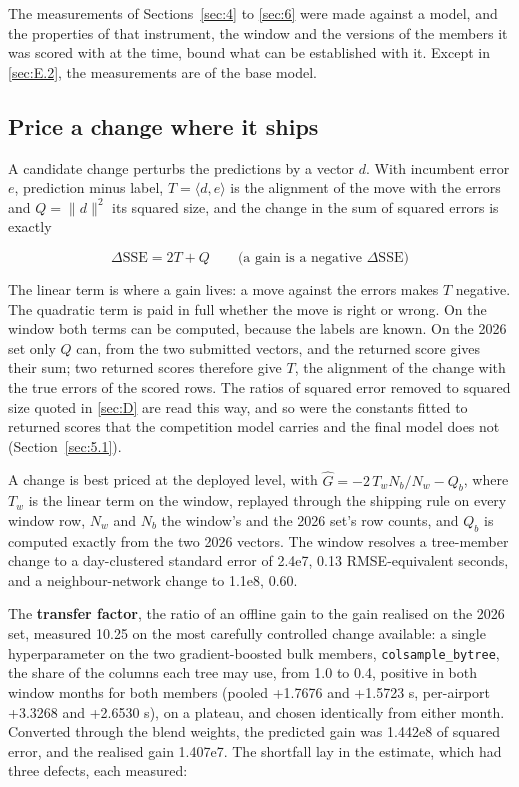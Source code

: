\documentclass[
  manuscript=article,
  layout=preprint,
  year=2026,
  volume=x,
]{extra/joas}
\begin{document}
The measurements of Sections~\ref{sec:4} to \ref{sec:6} were made against a model, and the properties of that instrument, the window and the versions of the members it was scored with at the time, bound what can be established with it. Except in \ref{sec:E.2}, the measurements are of the base model.

\subsection{Price a change where it ships}\label{sec:E.1}

A candidate change perturbs the predictions by a vector $d$. With incumbent error $e$, prediction minus label, $T = \langle d, e \rangle$ is the alignment of the move with the errors and $Q = \lVert d \rVert^2$ its squared size, and the change in the sum of squared errors is exactly

\begin{equation}
  \Delta \mathrm{SSE} = 2T + Q \qquad \text{(a gain is a negative } \Delta \mathrm{SSE}\text{)}
  \label{eq:identity}
\end{equation}

The linear term is where a gain lives: a move against the errors makes $T$ negative. The quadratic term is paid in full whether the move is right or wrong. On the window both terms can be computed, because the labels are known. On the 2026 set only $Q$ can, from the two submitted vectors, and the returned score gives their sum; two returned scores therefore give $T$, the alignment of the change with the true errors of the scored rows. The ratios of squared error removed to squared size quoted in \ref{sec:D} are read this way, and so were the constants fitted to returned scores that the competition model carries and the final model does not (Section~\ref{sec:5.1}).

A change is best priced at the deployed level, with $\hat{G} = -2\,T_w N_b / N_w - Q_b$, where $T_w$ is the linear term on the window, replayed through the shipping rule on every window row, $N_w$ and $N_b$ the window's and the 2026 set's row counts, and $Q_b$ is computed exactly from the two 2026 vectors. The window resolves a tree-member change to a day-clustered standard error of 2.4e7, 0.13 RMSE-equivalent seconds, and a neighbour-network change to 1.1e8, 0.60.

The \textbf{transfer factor}, the ratio of an offline gain to the gain realised on the 2026 set, measured 10.25 on the most carefully controlled change available: a single hyperparameter on the two gradient-boosted bulk members, \texttt{colsample\_bytree}, the share of the columns each tree may use, from 1.0 to 0.4, positive in both window months for both members (pooled +1.7676 and +1.5723 s, per-airport +3.3268 and +2.6530 s), on a plateau, and chosen identically from either month. Converted through the blend weights, the predicted gain was 1.442e8 of squared error, and the realised gain 1.407e7. The shortfall lay in the estimate, which had three defects, each measured:
\end{document}
